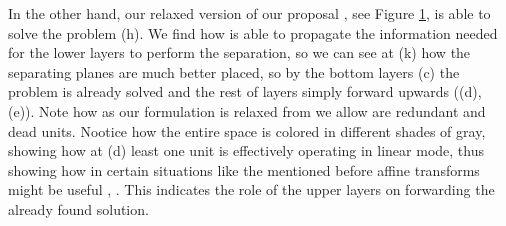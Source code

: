 \begin{figure}
{{    %
    }
    \parbox{.195\textwidth}{%
    }
  }
    \caption{\SepLayer}
    \label{fig:moonsLayerwise}
\end{figure}


In the other hand, our relaxed version of our proposal \SepLayer, see Figure \ref{fig:moonsLayerwise}, is able to solve the problem (h). We find how is able to propagate the information needed for the lower layers to perform the separation, so we can see at (k) how the separating planes are much better placed, so by the bottom layers (c) the problem is already solved and the rest of layers simply forward upwards ((d), (e)). Note how as our formulation is relaxed from \SepUnit we allow are redundant and dead units. Nootice how the entire space is colored in different shades of gray, showing how at (d) least one unit is effectively operating in linear mode, thus showing how in certain situations like the mentioned before affine transforms might be useful \cite{resnet}, \cite{batchnormAffine}. This indicates the role of the upper layers on forwarding the already found solution. 

